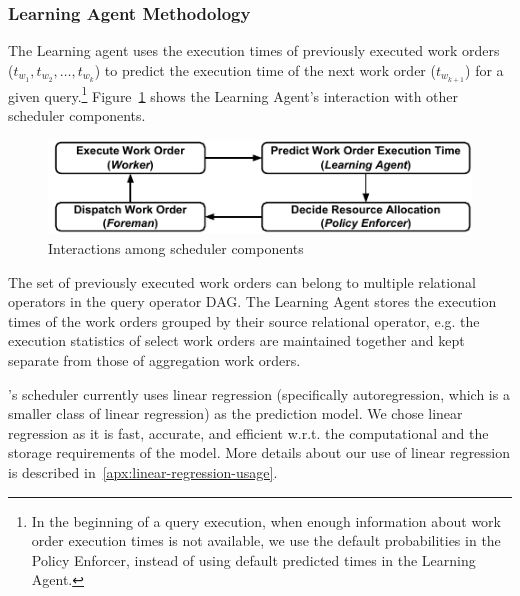 \subsubsection{Learning Agent Methodology}
The Learning agent uses the execution times of previously executed work orders\\
($t_{w_{1}}, t_{w_{2}}, \ldots, t_{w_{k}}$) to predict the execution time of 
the next work order ($t_{w_{k+1}}$) for a given query.\footnote{In the beginning of a query execution, when enough information about work order execution times is not available, we use the default probabilities in the Policy Enforcer, instead of using default predicted times in the Learning Agent.}
Figure~\ref{fig:scheduler-cycle} shows the Learning Agent's interaction with other scheduler components.

\begin{figure}
	\centering
	\includegraphics[width=0.75\textheight]{policy/figures/Compact-SchedulerCycle.pdf}
	\caption{Interactions among scheduler components}
	\label{fig:scheduler-cycle}
\end{figure}

The set of previously executed work orders can belong to multiple relational operators in the query operator DAG. 
The Learning Agent stores the execution times of the work orders grouped by their source relational operator, e.g. the execution statistics of select work orders are maintained together and kept separate from those of aggregation work orders. 

\sys{}'s scheduler currently uses linear regression (specifically autoregression, which is a smaller class of linear regression) as the prediction model.
We chose linear regression as it is fast, accurate, and efficient w.r.t. the computational and the storage requirements of the model. 
More details about our use of linear regression is described in~\ref{apx:linear-regression-usage}.


